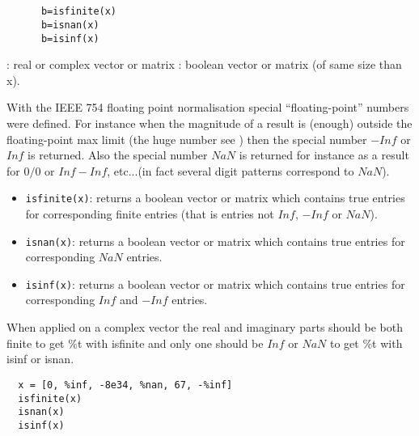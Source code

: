 

\begin{mandesc}
\\
\\
\end{mandesc}

\begin{calling_sequence}
\begin{verbatim}
      b=isfinite(x)  
      b=isnan(x)  
      b=isinf(x)  
\end{verbatim}
\end{calling_sequence}

\begin{parameters}
  \begin{varlist}
    : real or complex vector or matrix
    : boolean vector or matrix (of same size than x).
  \end{varlist}
\end{parameters}
\begin{mandescription}
  With the IEEE 754 floating point normalisation special ``floating-point''
  numbers were defined. For instance when the magnitude of a result is (enough)
  outside the floating-point max limit (the huge number see
  ) then the special number
  $-Inf$ or $Inf$ is returned. Also the special number $NaN$ is returned for
  instance as a result for $0 / 0$ or $Inf - Inf$, etc...(in fact several digit
  patterns correspond to $NaN$).
  \begin{itemize}
  \item \verb!isfinite(x)!: returns a boolean vector or matrix which contains true
    entries for corresponding finite entries (that is entries not $Inf$, $-Inf$ or
    $NaN$).
  \item \verb!isnan(x)!: returns a boolean vector or matrix which contains true
    entries for corresponding $NaN$ entries.
  \item \verb!isinf(x)!: returns a boolean vector or matrix which contains true
    entries for corresponding $Inf$ and $-Inf$ entries.
  \end{itemize}
  When applied on a complex vector the real and imaginary parts should
  be both finite to get \%t with isfinite and only one should be $Inf$
  or $NaN$ to get \%t with isinf or isnan. 
\end{mandescription}
\begin{examples}
\begin{Verbatim}
  x = [0, %inf, -8e34, %nan, 67, -%inf]
  isfinite(x)
  isnan(x)
  isinf(x)
\end{Verbatim}
\end{examples}
\begin{manseealso}
\end{manseealso}

